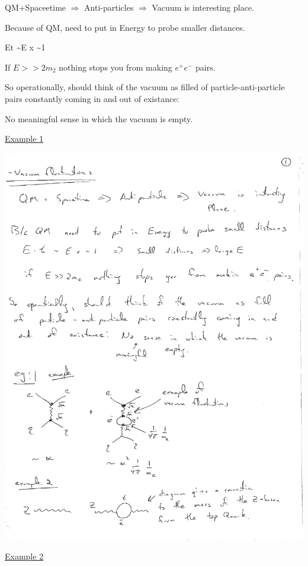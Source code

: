 {QM+Spaceetime $\Rightarrow$ Anti-particles $\Rightarrow$ Vacuum is interesting place.

Because of QM, need to put in Energy to probe smaller distances.

\be
E\cdot t \sim E \cdot x \sim 1 \Rightarrow {} \Rightarrow {}
\ee

If $E >> 2m_2$ nothing stops you from making $e^+e^-$ pairs.

So operationally, should think of the vacuum as filled of particle-anti-particle pairs constantly coming in and out of existance:  

No meaningful sense in which the vacuum is empty.

\underline{Example 1}

\bc
\includegraphics[width=\textwidth]{./VacuumFluctionations.pdf}
\ec

\underline{Example 2}

}
